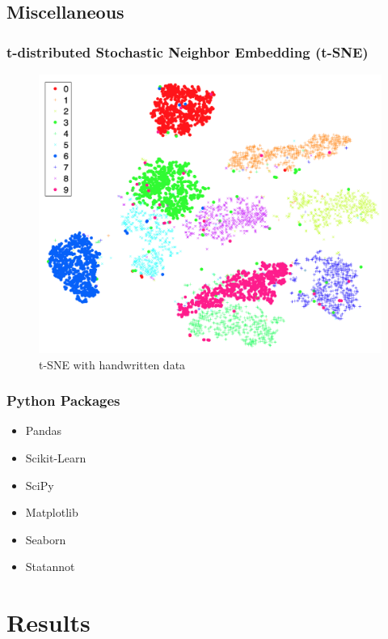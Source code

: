 \documentclass{beamer}
\begin{document}
    \subsection{Miscellaneous}
    \begin{frame}
        \frametitle{t-distributed Stochastic Neighbor Embedding (t-SNE)}

        \begin{figure}
            \includegraphics[width=0.6 \linewidth]{figures/tsne.png}
            \caption{t-SNE with handwritten data \protect\cite{tsne1}}
        \end{figure}
    \end{frame}

    \begin{frame}
        \frametitle{Python Packages}

        \begin{itemize}
            \item Pandas \cite{pandas1}
            \item Scikit-Learn \cite{sklearn1}
            \item SciPy \cite{scipy1}
            \item Matplotlib \cite{matplotlib1}
            \item Seaborn \cite{seaborn1}
            \item Statannot
        \end{itemize}
    \end{frame}

    \section{Results}
\end{document}

